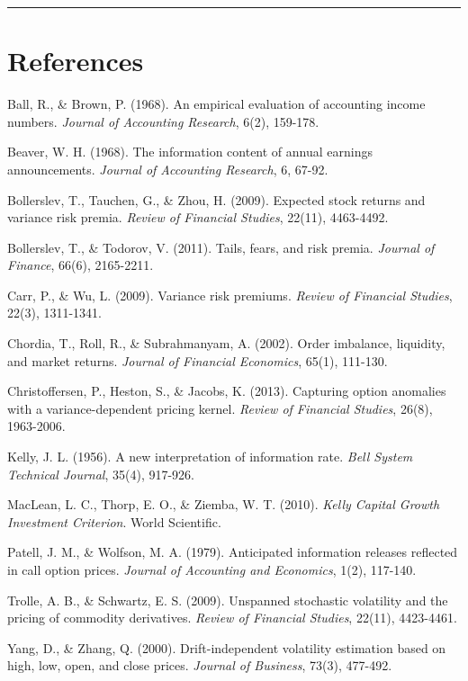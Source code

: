 \documentclass[
  american,
  11pt,
  11pt,
  letterpaper,
  onecolumn]{article}
\begin{document}
\begin{center}\rule{0.5\linewidth}{0.5pt}\end{center}

\section{References}\label{references}

Ball, R., \& Brown, P. (1968). An empirical evaluation of accounting
income numbers. \emph{Journal of Accounting Research}, 6(2), 159-178.

Beaver, W. H. (1968). The information content of annual earnings
announcements. \emph{Journal of Accounting Research}, 6, 67-92.

Bollerslev, T., Tauchen, G., \& Zhou, H. (2009). Expected stock returns
and variance risk premia. \emph{Review of Financial Studies}, 22(11),
4463-4492.

Bollerslev, T., \& Todorov, V. (2011). Tails, fears, and risk premia.
\emph{Journal of Finance}, 66(6), 2165-2211.

Carr, P., \& Wu, L. (2009). Variance risk premiums. \emph{Review of
Financial Studies}, 22(3), 1311-1341.

Chordia, T., Roll, R., \& Subrahmanyam, A. (2002). Order imbalance,
liquidity, and market returns. \emph{Journal of Financial Economics},
65(1), 111-130.

Christoffersen, P., Heston, S., \& Jacobs, K. (2013). Capturing option
anomalies with a variance-dependent pricing kernel. \emph{Review of
Financial Studies}, 26(8), 1963-2006.

Kelly, J. L. (1956). A new interpretation of information rate.
\emph{Bell System Technical Journal}, 35(4), 917-926.

MacLean, L. C., Thorp, E. O., \& Ziemba, W. T. (2010). \emph{Kelly
Capital Growth Investment Criterion}. World Scientific.

Patell, J. M., \& Wolfson, M. A. (1979). Anticipated information
releases reflected in call option prices. \emph{Journal of Accounting
and Economics}, 1(2), 117-140.

Trolle, A. B., \& Schwartz, E. S. (2009). Unspanned stochastic
volatility and the pricing of commodity derivatives. \emph{Review of
Financial Studies}, 22(11), 4423-4461.

Yang, D., \& Zhang, Q. (2000). Drift-independent volatility estimation
based on high, low, open, and close prices. \emph{Journal of Business},
73(3), 477-492.
\end{document}
